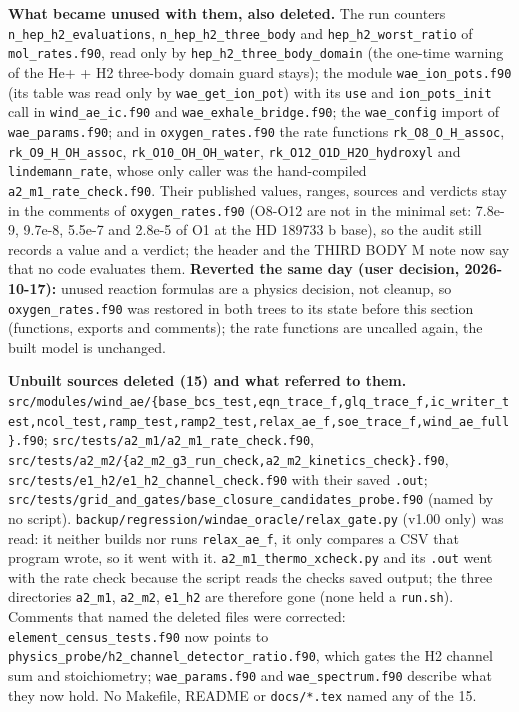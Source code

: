 \documentclass[english,a4paper]{my_memo}
\begin{document}
\textbf{What became unused with them, also deleted.} The run counters \texttt{n\_hep\_h2\_evaluations}, \texttt{n\_hep\_h2\_three\_body} and \texttt{hep\_h2\_worst\_ratio} of \texttt{mol\_rates.f90}, read only by \texttt{hep\_h2\_three\_body\_domain} (the one-time warning of the He+ + H2 three-body domain guard stays); the module \texttt{wae\_ion\_pots.f90} (its table was read only by \texttt{wae\_get\_ion\_pot}) with its \texttt{use} and \texttt{ion\_pots\_init} call in \texttt{wind\_ae\_ic.f90} and \texttt{wae\_exhale\_bridge.f90}; the \texttt{wae\_config} import of \texttt{wae\_params.f90}; and in \texttt{oxygen\_rates.f90} the rate functions \texttt{rk\_O8\_O\_H\_assoc}, \texttt{rk\_O9\_H\_OH\_assoc}, \texttt{rk\_O10\_OH\_OH\_water}, \texttt{rk\_O12\_O1D\_H2O\_hydroxyl} and \texttt{lindemann\_rate}, whose only caller was the hand-compiled \texttt{a2\_m1\_rate\_check.f90}. Their published values, ranges, sources and verdicts stay in the comments of \texttt{oxygen\_rates.f90} (O8-O12 are not in the minimal set: 7.8e-9, 9.7e-8, 5.5e-7 and 2.8e-5 of O1 at the HD 189733 b base), so the audit still records a value and a verdict; the header and the THIRD BODY M note now say that no code evaluates them. \textbf{Reverted the same day (user decision, 2026-10-17):} unused reaction formulas are a physics decision, not cleanup, so \texttt{oxygen\_rates.f90} was restored in both trees to its state before this section (functions, exports and comments); the rate functions are uncalled again, the built model is unchanged.

\textbf{Unbuilt sources deleted (15) and what referred to them.} \texttt{src/modules/wind\_ae/\{base\_bcs\_test,eqn\_trace\_f,glq\_trace\_f,ic\_writer\_test,ncol\_test,ramp\_test,ramp2\_test,relax\_ae\_f,soe\_trace\_f,wind\_ae\_full\}.f90}; \texttt{src/tests/a2\_m1/a2\_m1\_rate\_check.f90}, \texttt{src/tests/a2\_m2/\{a2\_m2\_g3\_run\_check,a2\_m2\_kinetics\_check\}.f90}, \texttt{src/tests/e1\_h2/e1\_h2\_channel\_check.f90} with their saved \texttt{.out}; \texttt{src/tests/grid\_and\_gates/base\_closure\_candidates\_probe.f90} (named by no script). \texttt{backup/regression/windae\_oracle/relax\_gate.py} (v1.00 only) was read: it neither builds nor runs \texttt{relax\_ae\_f}, it only compares a CSV that program wrote, so it went with it. \texttt{a2\_m1\_thermo\_xcheck.py} and its \texttt{.out} went with the rate check because the script reads the check\textquotesingle s saved output; the three directories \texttt{a2\_m1}, \texttt{a2\_m2}, \texttt{e1\_h2} are therefore gone (none held a \texttt{run.sh}). Comments that named the deleted files were corrected: \texttt{element\_census\_tests.f90} now points to \texttt{physics\_probe/h2\_channel\_detector\_ratio.f90}, which gates the H2 channel sum and stoichiometry; \texttt{wae\_params.f90} and \texttt{wae\_spectrum.f90} describe what they now hold. No Makefile, README or \texttt{docs/*.tex} named any of the 15.
\end{document}
